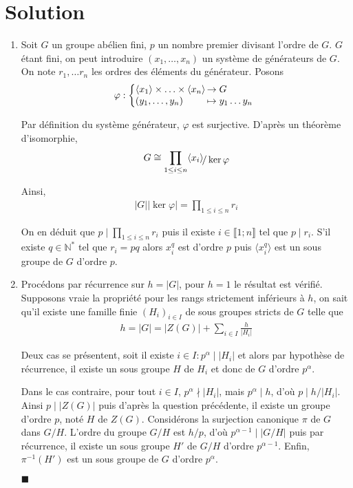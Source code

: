 \documentclass{article}
\newcommand*{\QED}{\hfill\ensuremath{\blacksquare}}%
\begin{document}
\section*{Solution}
\begin{enumerate}
\item Soit $G$ un groupe abélien fini, $p$ un nombre premier divisant l'ordre de $G$. $G$ étant fini, on peut introduire $(x_1,\ldots,x_n)$ un système de générateurs de $G$. On note $r_1,\ldots r_n$ les ordres des éléments du générateur. Posons
\begin{align*}
\varphi : \left\{
     \begin{array}{@{}l@{\thinspace}l}
     \langle x_1\rangle\times\ldots\times\langle x_n\rangle &\to G\\
     (y_1,\ldots,y_n)&\mapsto y_1\ldots y_n
     \end{array}
   \right.   
\end{align*}

Par définition du système générateur, $\varphi$ est surjective. 
D'après un théorème d'isomorphie, 
\begin{align*}
G\cong \prod_{1\leq i\leq n}\langle x_i\rangle \!\raisebox{-.50ex}{\ensuremath{/ \ker \varphi}} \end{align*}

Ainsi, 
\begin{align*}
|G||\ker \varphi| = \prod_{1\leq i\leq n}r_i 
\end{align*}

On en déduit que $p\mid \prod_{1\leq i\leq n} r_i$ puis il existe $i\in \llbracket 1;n\rrbracket$ tel que $p\mid r_i$. S'il existe $q\in \mathbb{N}^*$ tel que $r_i = pq$ alors $x_{i}^q$ est d'ordre $p$ puis $\langle x_i^q\rangle$ est un sous groupe de $G$ d'ordre $p$. 
\item Procédons par récurrence sur $h=|G|$, pour $h=1$ le résultat est vérifié. Supposons vraie la propriété pour les rangs strictement inférieurs à $h$, on sait qu'il existe une famille finie $(H_i)_{i\in I}$ de sous groupes stricts de $G$ telle que
\begin{align*}
h = |G|=|Z(G)|+\sum_{i\in I} \frac{h}{|H_i|}
\end{align*}

Deux cas se présentent, soit il existe $i\in I : p^{\alpha} \mid |H_i|$ et alors par hypothèse de récurrence, il existe un sous groupe $H$ de $H_i$ et donc de $G$ d'ordre $p^{\alpha}$. 

Dans le cas contraire, pour tout $i\in I$, $p^{\alpha} \nmid |H_i|$, mais $p^{\alpha}\mid h$, d'où $p\mid h/|H_i|$. Ainsi $p\mid |Z(G)|$ puis d'après la question précédente, il existe un groupe d'ordre $p$, noté $H$ de $Z(G)$. Considérons la surjection canonique $\pi$ de $G$ dans $G/H$. L'ordre du groupe $G/H$ est $h/p$, d'où $p^{\alpha-1}\mid |G/H|$ puis par récurrence, il existe un sous groupe $H'$ de $G/H$ d'ordre $p^{\alpha -1}$. Enfin, $\pi^{-1}(H')$ est un sous groupe de $G$ d'ordre $p^{\alpha}$.

\QED
\end{enumerate}
\end{document}
